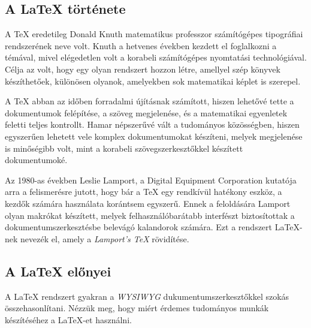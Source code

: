 \subsection{A \LaTeX{} története}

A \TeX{} eredetileg Donald Knuth matematikus professzor számítógépes
tipográfiai rendszerének neve volt. Knuth a hetvenes években kezdett el
foglalkozni a témával, mivel elégedetlen volt a korabeli számítógépes
nyomtatási technológiával. Célja az volt, hogy egy olyan rendszert hozzon létre,
amellyel szép könyvek készíthetőek, különösen olyanok, amelyekben sok
matematikai képlet is szerepel. \cite{texbook}

A \TeX{} abban az időben forradalmi újításnak számított, hiszen lehetővé tette
a dokumentumok felépítése, a szöveg megjelenése, és a matematikai egyenletek
feletti teljes kontrollt. Hamar népszerűvé vált a tudományos közösségben, hiszen
egyszerűen lehetett vele komplex dokumentumokat készíteni, melyek megjelenése
is minőségibb volt, mint a korabeli szövegszerkesztőkkel készített
dokumentumoké.

Az 1980-as években Leslie Lamport, a Digital Equipment Corporation kutatója
arra a felismerésre jutott, hogy bár a \TeX{} egy rendkívül hatékony eszköz, a
kezdők számára használata korántsem egyszerű. Ennek a feloldására Lamport
olyan makrókat készített, melyek felhasználóbarátabb interfészt biztosítottak a
dokumentumszerkesztésbe belevágó kalandorok számára. Ezt a rendszert
\LaTeX{}-nek nevezék el, amely a \textit{Lamport's \TeX} rövidítése.
\cite{latex2e}

\subsection{A \LaTeX{} előnyei}

A \LaTeX{} rendszert gyakran a \textit{WYSIWYG} dukumentumszerkesztőkkel
szokás összehasonlítani. Nézzük meg, hogy miért érdemes tudományos munkák
készítéséhez a \LaTeX{}-et használni.

